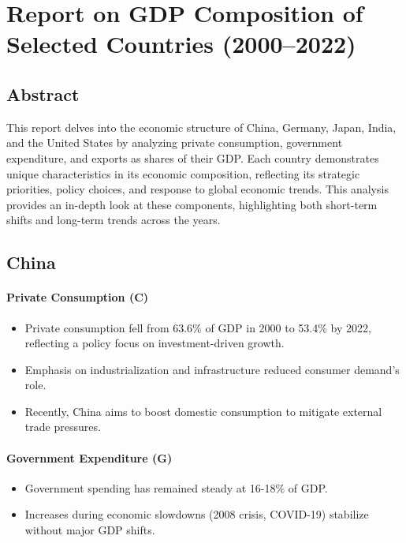 \documentclass[a4paper,12pt]{extarticle} %
\begin{document}
\clearpage

\section{Report on GDP Composition of Selected Countries (2000–2022)}
\subsection{Abstract}
This report delves into the economic structure of China, Germany, Japan, India, and the United States by analyzing private consumption, government expenditure, and exports as shares of their GDP. Each country demonstrates unique characteristics in its economic composition, reflecting its strategic priorities, policy choices, and response to global economic trends. This analysis provides an in-depth look at these components, highlighting both short-term shifts and long-term trends across the years.\\

\cite{wb}
\subsection{China}

\paragraph{Private Consumption (C)}
\begin{itemize}
    \item Private consumption fell from 63.6\% of GDP in 2000 to 53.4\% by 2022, reflecting a policy focus on investment-driven growth.
    \item Emphasis on industrialization and infrastructure reduced consumer demand's role.
    \item Recently, China aims to boost domestic consumption to mitigate external trade pressures.
\end{itemize}

\paragraph{Government Expenditure (G)}
\begin{itemize}
    \item Government spending has remained steady at 16-18\% of GDP.
    \item Increases during economic slowdowns (2008 crisis, COVID-19) stabilize without major GDP shifts.
\end{itemize}
\end{document}
